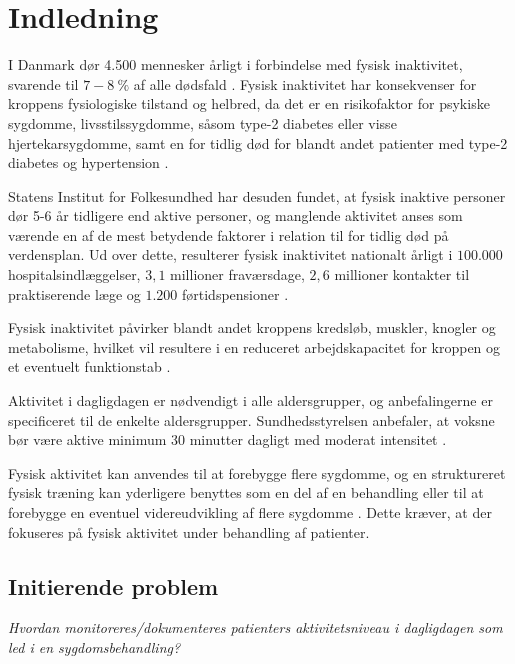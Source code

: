\chapter{Indledning} \label{sec:indledning}
I Danmark dør 4.500 mennesker årligt i forbindelse med fysisk inaktivitet, svarende til $7-8~\%$ af alle dødsfald \citep{aagaard2014}. Fysisk inaktivitet har konsekvenser for kroppens fysiologiske tilstand og helbred, da det er en risikofaktor for psykiske sygdomme, livsstilssygdomme, såsom type-2 diabetes eller visse hjertekarsygdomme, samt en for tidlig død for blandt andet patienter med type-2 diabetes og hypertension \citep{motionsraad2007}. 

Statens Institut for Folkesundhed har desuden fundet, at fysisk inaktive personer dør 5-6 år tidligere end aktive personer, og manglende aktivitet anses som værende en af de mest betydende faktorer i relation til for tidlig død på verdensplan. Ud over dette, resulterer fysisk inaktivitet nationalt årligt i $100.000$ hospitalsindlæggelser, $3,1$ millioner fraværsdage, $2,6$ millioner kontakter til praktiserende læge og $1.200$ førtidspensioner \citep{christensen2012}.

Fysisk inaktivitet påvirker blandt andet kroppens kredsløb, muskler, knogler og metabolisme, hvilket vil resultere i en reduceret arbejdskapacitet for kroppen og et eventuelt funktionstab \citep{motionsraad2007}.

Aktivitet i dagligdagen er nødvendigt i alle aldersgrupper, og anbefalingerne er specificeret til de enkelte aldersgrupper.
Sundhedsstyrelsen anbefaler, at voksne bør være aktive minimum 30 minutter dagligt med moderat intensitet \citep{pedersen2011}.

Fysisk aktivitet kan anvendes til at forebygge flere sygdomme, og en struktureret fysisk træning kan yderligere benyttes som en del af en behandling eller til at forebygge en eventuel videreudvikling af flere sygdomme \citep{motionsraad2007}. Dette kræver, at der fokuseres på fysisk aktivitet under behandling af patienter.


\section{Initierende problem}
\textit{Hvordan monitoreres/dokumenteres patienters aktivitetsniveau i dagligdagen som led i en sygdomsbehandling?}  
